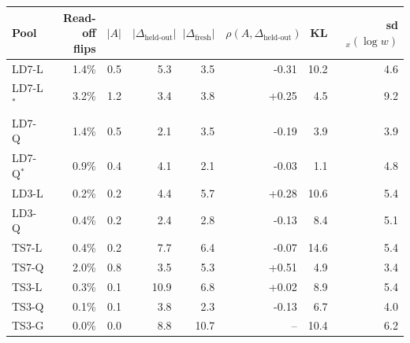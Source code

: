 \begin{tabular}{lrrrrrrr}
\toprule
Pool & \makecell{Read-off\\flips} & $|A|$ & $|\Delta_{\text{held-out}}|$ & $|\Delta_{\text{fresh}}|$ & $\rho(A,\Delta_{\text{held-out}})$ & KL & sd$_x(\log w)$ \\
\midrule
LD7-L & 1.4\% & 0.5 & 5.3 & 3.5 & -0.31 & 10.2 & 4.6 \\
LD7-L$^\ast$ & 3.2\% & 1.2 & 3.4 & 3.8 & +0.25 & 4.5 & 9.2 \\
LD7-Q & 1.4\% & 0.5 & 2.1 & 3.5 & -0.19 & 3.9 & 3.9 \\
LD7-Q$^\ast$ & 0.9\% & 0.4 & 4.1 & 2.1 & -0.03 & 1.1 & 4.8 \\
LD3-L & 0.2\% & 0.2 & 4.4 & 5.7 & +0.28 & 10.6 & 5.4 \\
LD3-Q & 0.4\% & 0.2 & 2.4 & 2.8 & -0.13 & 8.4 & 5.1 \\
TS7-L & 0.4\% & 0.2 & 7.7 & 6.4 & -0.07 & 14.6 & 5.4 \\
TS7-Q & 2.0\% & 0.8 & 3.5 & 5.3 & +0.51 & 4.9 & 3.4 \\
TS3-L & 0.3\% & 0.1 & 10.9 & 6.8 & +0.02 & 8.9 & 5.4 \\
TS3-Q & 0.1\% & 0.1 & 3.8 & 2.3 & -0.13 & 6.7 & 4.0 \\
TS3-G & 0.0\% & 0.0 & 8.8 & 10.7 & -- & 10.4 & 6.2 \\
\bottomrule
\end{tabular}
